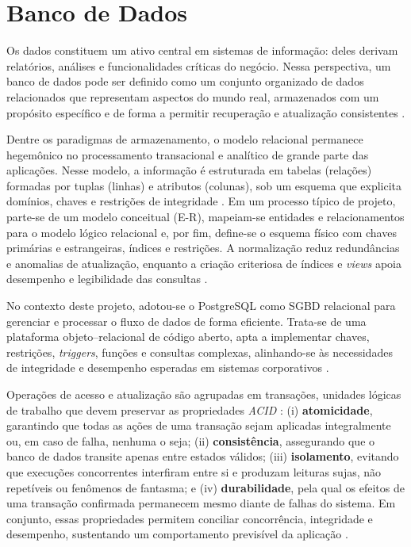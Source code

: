 \chapter{Banco de Dados}

Os dados constituem um ativo central em sistemas de informação: deles derivam relatórios, análises e funcionalidades críticas do negócio. Nessa perspectiva, um banco de dados pode ser definido como um conjunto organizado de dados relacionados que representam aspectos do mundo real, armazenados com um propósito específico e de forma a permitir recuperação e atualização consistentes \parencite{Machado2020}.

Dentre os paradigmas de armazenamento, o modelo relacional permanece hegemônico no processamento transacional e analítico de grande parte das aplicações. Nesse modelo, a informação é estruturada em tabelas (relações) formadas por tuplas (linhas) e atributos (colunas), sob um esquema que explicita domínios, chaves e restrições de integridade \parencite{Silberschatz2012}. Em um processo típico de projeto, parte-se de um modelo conceitual (E-R), mapeiam-se entidades e relacionamentos para o modelo lógico relacional e, por fim, define-se o esquema físico com chaves primárias e estrangeiras, índices e restrições. A normalização reduz redundâncias e anomalias de atualização, enquanto a criação criteriosa de índices e \emph{views} apoia desempenho e legibilidade das consultas \parencite{Silberschatz2012}.

No contexto deste projeto, adotou-se o PostgreSQL como SGBD relacional para gerenciar e processar o fluxo de dados de forma eficiente. Trata-se de uma plataforma objeto–relacional de código aberto, apta a implementar chaves, restrições, \emph{triggers}, funções e consultas complexas, alinhando-se às necessidades de integridade e desempenho esperadas em sistemas corporativos \parencite{Silberschatz2012}.

Operações de acesso e atualização são agrupadas em transações, unidades lógicas de trabalho que devem preservar as propriedades \emph{ACID} \parencite{Silberschatz2012}: (i) \textbf{atomicidade}, garantindo que todas as ações de uma transação sejam aplicadas integralmente ou, em caso de falha, nenhuma o seja; (ii) \textbf{consistência}, assegurando que o banco de dados transite apenas entre estados válidos; (iii) \textbf{isolamento}, evitando que execuções concorrentes interfiram entre si e produzam leituras sujas, não repetíveis ou fenômenos de fantasma; e (iv) \textbf{durabilidade}, pela qual os efeitos de uma transação confirmada permanecem mesmo diante de falhas do sistema. Em conjunto, essas propriedades permitem conciliar concorrência, integridade e desempenho, sustentando um comportamento previsível da aplicação \parencite{Silberschatz2012}.


